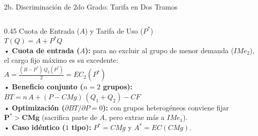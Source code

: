 \documentclass[aspectratio=169, 10pt]{beamer}
\begin{document}
\begin{frame}{2b. Discriminación de 2do Grado: Tarifa en Dos Tramos}
\begin{columns}[T]
    \begin{column}{0.45\textwidth}
      {\scriptsize\color{grisTexto}Cuota de Entrada (\(A\)) y Tarifa de Uso (\(P^*\))}\\[1pt]
      {\small\color{azulPrincipal}\textbf{\(T(Q) = A + P^*Q\)}}\\[2pt]
      {\scriptsize
        • \textbf{Cuota de entrada (\(A\)):} para no excluir al grupo de menor demanda (\(IMe_2\)), el cargo fijo máximo es su excedente:\\
        \quad \(\displaystyle A = \frac{(B - P^*)\,Q_2(P^*)}{2} = EC_2(P^*)\)\\[3pt]
        • \textbf{Beneficio conjunto (\(n = 2\) grupos):}\\
        \quad \(BT = n\,A + (P - CMg)\,(Q_1 + Q_2) - CF\)\\[3pt]
        • \textbf{Optimización (\(\partial BT / \partial P = 0\)):} con grupos heterogéneos conviene fijar \(\mathbf{P^* > CMg}\) (sacrifica parte de \(A\), pero extrae más a \(IMe_1\)).\\[3pt]
        • \textbf{Caso idéntico (\(1\) tipo):} \(P^* = CMg\) y \(A^* = EC(CMg)\).
      }
    \end{column}
  \end{columns}

\end{frame}
\end{document}
